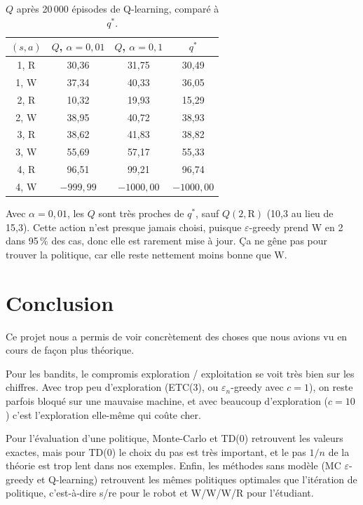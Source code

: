 \documentclass[11pt,a4paper]{article}
\begin{document}
\begin{table}[H]
  \centering
  \begin{tabular}{cccc}
    \toprule
    $(s, a)$ & $Q$, $\alpha = 0,01$ & $Q$, $\alpha = 0,1$ & $q^*$ \\
    \midrule
    1, R & 30,36 & 31,75 & 30,49 \\
    1, W & 37,34 & 40,33 & 36,05 \\
    2, R & 10,32 & 19,93 & 15,29 \\
    2, W & 38,95 & 40,72 & 38,93 \\
    3, R & 38,62 & 41,83 & 38,82 \\
    3, W & 55,69 & 57,17 & 55,33 \\
    4, R & 96,51 & 99,21 & 96,74 \\
    4, W & $-999,99$ & $-1000,00$ & $-1000,00$ \\
    \bottomrule
  \end{tabular}
  \caption{$Q$ après 20\,000 épisodes de Q-learning, comparé à $q^*$.}
\end{table}

Avec $\alpha = 0,01$, les $Q$ sont très proches de $q^*$, sauf $Q(2, \text{R})$ (10,3 au lieu de 15,3). Cette action n'est presque jamais choisi, puisque $\varepsilon$-greedy prend W en 2 dans 95\,\% des cas, donc elle est rarement mise à jour. Ça ne gêne pas pour trouver la politique, car elle reste nettement moins bonne que W.

\section*{Conclusion}

Ce projet nous a permis de voir concrètement des choses que nous avions vu en cours de façon plus théorique.

Pour les bandits, le compromis exploration / exploitation se voit très bien sur les chiffres. Avec trop peu d'exploration (ETC(3), ou $\varepsilon_n$-greedy avec $c = 1$), on reste parfois bloqué sur une mauvaise machine, et avec beaucoup d'exploration ($c = 10$) c'est l'exploration elle-même qui coûte cher.

Pour l'évaluation d'une politique, Monte-Carlo et TD(0) retrouvent les valeurs exactes, mais pour TD(0) le choix du pas est très important, et le pas $1/n$ de la théorie est trop lent dans nos exemples. Enfin, les méthodes sans modèle (MC $\varepsilon$-greedy et Q-learning) retrouvent les mêmes politiques optimales que l'itération de politique, c'est-à-dire s/re pour le robot et W/W/W/R pour l'étudiant.
\end{document}
